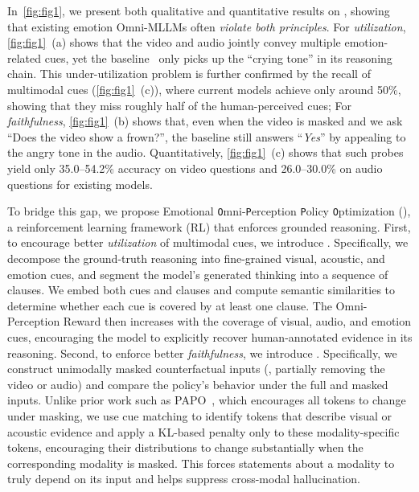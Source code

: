 \documentclass{article}
\theoremstyle{plain}
\theoremstyle{definition}
\theoremstyle{remark}
\begin{document}
In~\cref{fig:fig1}, we present both qualitative and quantitative results on \ourbench, showing that existing emotion Omni-MLLMs often \textit{violate both principles}. For \textit{utilization}, \cref{fig:fig1}~(a) shows that the video and audio jointly convey multiple emotion-related cues, yet the baseline~\cite{lian2025affectgptr1} only picks up the ``crying tone'' in its reasoning chain. This {under-utilization} problem is further confirmed by the recall of multimodal cues (\cref{fig:fig1}~(c)), where current models achieve only around 50\%, showing that they miss roughly half of the human-perceived cues; For \textit{faithfulness}, \cref{fig:fig1}~(b) shows that, even when the video is masked and we ask ``Does the video show a frown?'', the baseline still answers ``\emph{Yes}'' by appealing to the angry tone in the audio. Quantitatively, \cref{fig:fig1}~(c) shows that such probes yield only 35.0–54.2\% accuracy on video questions and 26.0–30.0\% on audio questions for existing models.


To bridge this gap, we propose Emotional \texttt{O}mni-\texttt{P}erception \texttt{P}olicy \texttt{O}ptimization (\ourmethod), a reinforcement learning framework (RL) that enforces grounded reasoning. First, to encourage better \textit{utilization} of multimodal cues, we introduce \textbf{\ourreward}. Specifically, we decompose the ground-truth reasoning into fine-grained visual, acoustic, and emotion cues, and segment the model’s generated thinking into a sequence of clauses. We embed both cues and clauses and compute semantic similarities to determine whether each cue is covered by at least one clause. The Omni-Perception Reward then increases with the coverage of visual, audio, and emotion cues, encouraging the model to explicitly recover human-annotated evidence in its reasoning.
Second, to enforce better \textit{faithfulness}, we introduce \textbf{\ourloss}. Specifically, we construct unimodally masked counterfactual inputs (\eg, partially removing the video or audio) and compare the policy’s behavior under the full and masked inputs. Unlike prior work such as PAPO~\cite{wang2025perception}, which encourages all tokens to change under masking, we use cue matching to identify tokens that describe visual or acoustic evidence and apply a KL-based penalty only to these modality-specific tokens, encouraging their distributions to change substantially when the corresponding modality is masked. This forces statements about a modality to truly depend on its input and helps suppress cross-modal hallucination.
\end{document}
